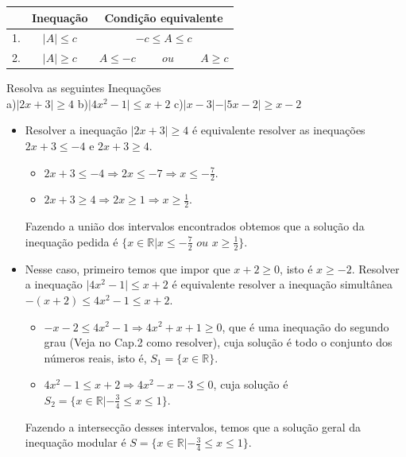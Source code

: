 \begin{center}
\begin{tabular}{|c|c|c|}
\hline
 & Inequação & Condição equivalente \\
\hline
1. &  $|A|\leq c$ & $-c \leq A \leq c$ \\
\hline
2. & $|A| \geq c$ & $A \leq -c \hspace{1cm} ou \hspace{1cm} A \geq c$ \\
\hline
\end{tabular}
\end{center}


\begin{exe} Resolva as seguintes Inequações \\
a)$ \vert  2x+3\vert \geq 4$ \hspace{1cm} b)$\vert 4x^2-1 \vert \leq x+2$ \hspace{1cm} c)$\vert x-3 \vert - \vert 5x-2 \vert  \geq x-2$
\end{exe}
\color{red}
\begin{itemize}
    \item[a)] Resolver a inequação $ \vert  2x+3\vert \geq 4$  é equivalente resolver as inequações $2x+3 \leq -4$ e $2x+3 \geq 4$.
    \begin{itemize}
        \item[1.] $2x+3 \leq -4 \Longrightarrow 2x \leq -7 \Longrightarrow x  \leq -\frac{7}{2}$.
        \item[2.] $2x+3 \geq 4 \Longrightarrow 2x \geq 1 \Longrightarrow x \geq \frac{1}{2}$.
    \end{itemize}
Fazendo a união dos intervalos encontrados obtemos que a solução da inequação pedida é $\{x \in \mathbb{R} | x  \leq -\frac{7}{2} \,\, ou \,\, x \geq \frac{1}{2}  \}$.
\item[b)] Nesse caso, primeiro temos que impor que $x+2 \geq 0$, isto é $x \geq -2$. Resolver a inequação $\vert 4x^2-1 \vert \leq x+2$ é equivalente resolver a inequação simultânea $-(x+2) \leq 4x^2-1 \leq x+2$.
\begin{itemize}
    \item[1.] $-x-2 \leq 4x^2-1 \Longrightarrow 4x^2+x+1 \geq 0$, que é uma inequação do segundo grau (Veja no Cap.2 como resolver), cuja solução é todo o conjunto dos números reais, isto é, $S_1= \{ x \in \mathbb{R} \}$.
    \item[2.] $4x^2-1 \leq x+2 \Longrightarrow 4x^2-x-3 \leq 0$, cuja solução é $S_2= \{ x \in \mathbb{R}| -\frac{3}{4} \leq x \leq 1 \}$.
\end{itemize}
Fazendo a intersecção desses intervalos, temos que a solução geral da inequação modular é $S=\{ x \in \mathbb{R} | -\frac{3}{4} \leq x \leq 1  \}$.
\end{itemize}
\color{black}
